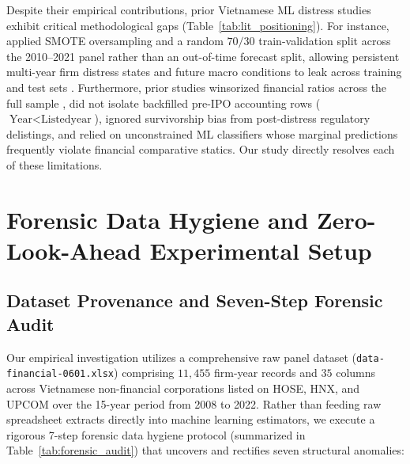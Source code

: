 \documentclass[11pt,a4paper]{article}
\begin{document}
Despite their empirical contributions, prior Vietnamese ML distress studies exhibit critical methodological gaps (Table~\ref{tab:lit_positioning}). For instance, \citet{tran2022explainable} applied SMOTE oversampling and a random $70/30$ train-validation split across the 2010--2021 panel rather than an out-of-time forecast split, allowing persistent multi-year firm distress states and future macro conditions to leak across training and test sets \citep{bailey2014pseudo,lopez2018advances}. Furthermore, prior studies winsorized financial ratios across the full sample \citep[e.g.,][]{tran2023examining}, did not isolate backfilled pre-IPO accounting rows ($\text{Year} < \text{Listedyear}$), ignored survivorship bias from post-distress regulatory delistings, and relied on unconstrained ML classifiers whose marginal predictions frequently violate financial comparative statics. Our study directly resolves each of these limitations.

\section{Forensic Data Hygiene and Zero-Look-Ahead Experimental Setup}
\label{sec:data}

\subsection{Dataset Provenance and Seven-Step Forensic Audit}
Our empirical investigation utilizes a comprehensive raw panel dataset (\texttt{data-financial-0601.xlsx}) comprising $11,455$ firm-year records and $35$ columns across Vietnamese non-financial corporations listed on HOSE, HNX, and UPCOM over the 15-year period from 2008 to 2022. Rather than feeding raw spreadsheet extracts directly into machine learning estimators, we execute a rigorous 7-step forensic data hygiene protocol (summarized in Table~\ref{tab:forensic_audit}) that uncovers and rectifies seven structural anomalies:
\end{document}
